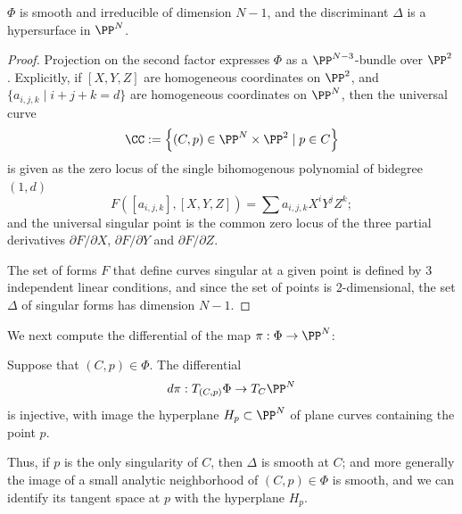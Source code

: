\begin{proposition}
 $\Phi$ is smooth and irreducible of dimension $N-1$, and the discriminant $\Delta$ is a hypersurface in $\PP^N$.
\end{proposition}
\begin{proof}
Projection on the second factor expresses $\Phi$ as a $\PP^{N-3}$-bundle over $\PP^2$. Explicitly, if $[X,Y,Z]$ are homogeneous coordinates on $\PP^2$, and $\{a_{i,j,k} \mid i+j+k = d \}$ are homogeneous coordinates on $\PP^N$, then the universal curve 
$$
\CC := \left\{ (C, p) \in \PP^N \times \PP^2 \mid p \in C \right\}
$$
is given as the zero locus of the single bihomogenous polynomial of bidegree $(1, d)$
$$
F([a_{i,j,k}], [X,Y,Z] ) = \sum a_{i,j,k} X^iY^jZ^k;
$$
and the universal singular point is the common zero locus of the three partial derivatives $\partial F/\partial X$, $\partial F/\partial Y$ and  $\partial F/\partial Z$. 

The set of forms $F$ that define curves singular at a given point is defined by 3 independent linear conditions, and since the set of 
points is 2-dimensional, the set $\Delta$ of singular forms has dimension $N-1$.
\end{proof}
 
We next compute the differential of the map $\pi : \Phi \to \PP^N$:

\begin{lemma}\label{tangent space to discriminant}
Suppose that $(C,p)\in \Phi$.  The differential 
$$
d\pi : T_{(C,p)}\Phi \to T_C \PP^N
$$
is injective, with image the hyperplane $H_p \subset \PP^N$ of plane curves containing the point $p$.
\end{lemma}

Thus, if $p$ is the only singularity of $C$, then $\Delta$ is smooth at $C$; and more generally the image of a small analytic neighborhood of $(C,p) \in \Phi$ is smooth, and we can identify its tangent space at $p$ with the hyperplane $H_p$. 

